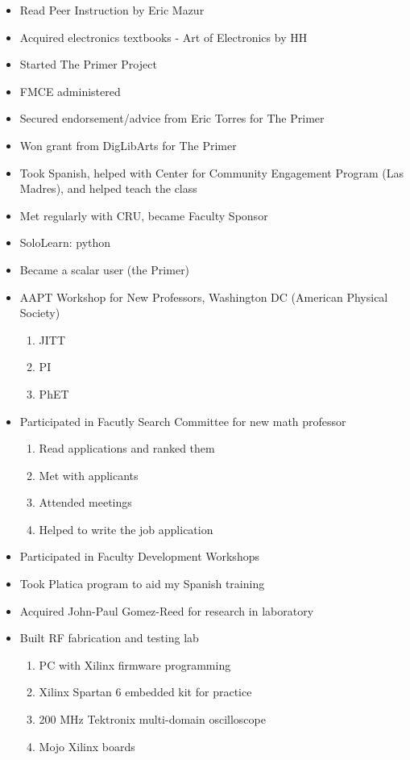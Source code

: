 \begin{itemize}
\item Read Peer Instruction by Eric Mazur
\item Acquired electronics textbooks - Art of Electronics by HH
\item Started The Primer Project
\item FMCE administered
\item Secured endorsement/advice from Eric Torres for The Primer
\item Won grant from DigLibArts for The Primer
\item Took Spanish, helped with Center for Community Engagement Program (Las Madres), and helped teach the class
\item Met regularly with CRU, became Faculty Sponsor
\item SoloLearn: python
\item Became a scalar user (the Primer)
\item AAPT Workshop for New Professors, Washington DC (American Physical Society)
\begin{enumerate}
\item JITT
\item PI
\item PhET
\end{enumerate}
\item Participated in Facutly Search Committee for new math professor
\begin{enumerate}
\item Read applications and ranked them
\item Met with applicants
\item Attended meetings
\item Helped to write the job application
\end{enumerate}
\item Participated in Faculty Development Workshops
\item Took Platica program to aid my Spanish training
\item Acquired John-Paul Gomez-Reed for research in laboratory
\item Built RF fabrication and testing lab
\begin{enumerate}
\item PC with Xilinx firmware programming
\item Xilinx Spartan 6 embedded kit for practice
\item 200 MHz Tektronix multi-domain oscilloscope
\item Mojo Xilinx boards

\end{enumerate}
\end{itemize}

